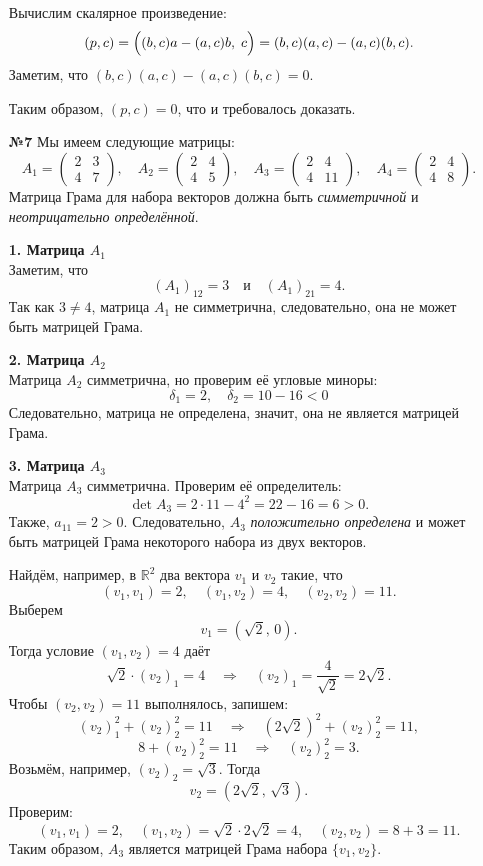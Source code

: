 \documentclass[a4paper]{article}
\begin{document}
\begin{enumerate}
    Вычислим скалярное произведение:
    \[
    (p, c) = \Bigl( (b,c)a - (a,c)b,\; c \Bigr) = (b,c)(a,c) - (a,c)(b,c).
    \]
    Заметим, что \( (b,c)(a,c) - (a,c)(b,c) = 0 \).
    
    Таким образом, \( (p, c) = 0 \), что и требовалось доказать.
    
    \item[\textbf{№7}]
    Мы имеем следующие матрицы:
    \[
    A_1=\begin{pmatrix} 2 & 3 \\ 4 & 7 \end{pmatrix}, \quad
    A_2=\begin{pmatrix} 2 & 4 \\ 4 & 5 \end{pmatrix}, \quad
    A_3=\begin{pmatrix} 2 & 4 \\ 4 & 11 \end{pmatrix}, \quad
    A_4=\begin{pmatrix} 2 & 4 \\ 4 & 8 \end{pmatrix}.
    \]
    Матрица Грама для набора векторов должна быть \emph{симметричной} и \emph{неотрицательно определённой}.
    
    \textbf{1. Матрица \(A_1\)}\\
    Заметим, что
    \[
    (A_1)_{12}=3 \quad \text{и} \quad (A_1)_{21}=4.
    \]
    Так как \(3\neq 4\), матрица \(A_1\) не симметрична, следовательно, она не может быть матрицей Грама.

    
    \textbf{2. Матрица \(A_2\)}\\
    Матрица \(A_2\) симметрична, но проверим её угловые миноры:
    $$\delta_1 = 2, \quad \delta_2 = 10-16 < 0$$
    Следовательно, матрица не определена, значит, она не является матрицей Грама.

        
    \textbf{3. Матрица \(A_3\)}\\
    Матрица \(A_3\) симметрична. Проверим её определитель:
    \[
    \det A_3 = 2\cdot 11 - 4^2 = 22-16 = 6 > 0.
    \]
    Также, \(a_{11}=2>0\). Следовательно, \(A_3\) \emph{положительно определена} и может быть матрицей Грама некоторого набора из двух векторов.

    Найдём, например, в \(\mathbb{R}^2\) два вектора \(v_1\) и \(v_2\) такие, что
    \[
    (v_1,v_1)=2,\quad (v_1,v_2)=4,\quad (v_2,v_2)=11.
    \]
    Выберем
    \[
    v_1=(\sqrt{2},\, 0).
    \]
    Тогда условие \((v_1,v_2)=4\) даёт
    \[
    \sqrt{2}\cdot (v_2)_1 = 4 \quad \Longrightarrow \quad (v_2)_1=\frac{4}{\sqrt{2}}=2\sqrt{2}.
    \]
    Чтобы \((v_2,v_2)=11\) выполнялось, запишем:
    \[
    (v_2)_1^2+(v_2)_2^2=11 \quad \Longrightarrow \quad (2\sqrt{2})^2+(v_2)_2^2=11,
    \]
    \[
    8+(v_2)_2^2=11 \quad \Longrightarrow \quad (v_2)_2^2=3.
    \]
    Возьмём, например, \((v_2)_2=\sqrt{3}\). Тогда
    \[
    v_2=(2\sqrt{2},\, \sqrt{3}).
    \]
    Проверим:
    \[
    (v_1,v_1)=2,\quad (v_1,v_2)=\sqrt{2}\cdot 2\sqrt{2}=4,\quad (v_2,v_2)=8+3=11.
    \]
    Таким образом, \(A_3\) является матрицей Грама набора \(\{v_1,v_2\}\).


\end{enumerate}
\end{document}
